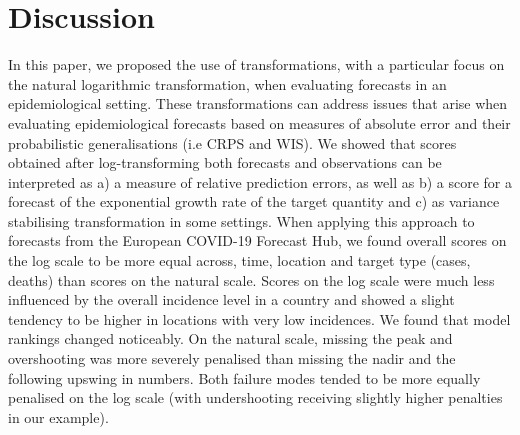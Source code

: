 \documentclass{article}
\begin{document}
\section{Discussion}
\label{sec:discussion}

In this paper, we proposed the use of transformations, with a particular focus on the natural logarithmic transformation, when evaluating forecasts in an epidemiological setting. These transformations can address issues that arise when evaluating epidemiological forecasts based on measures of absolute error and their probabilistic generalisations (i.e CRPS and WIS). We showed that scores obtained after log-transforming both forecasts and observations can be interpreted as a) a measure of relative prediction errors, as well as b) a score for a forecast of the exponential growth rate of the target quantity and c) as variance stabilising transformation in some settings.
When applying this approach to forecasts from the European COVID-19 Forecast Hub, we found overall scores on the log scale to be more equal across, time, location and target type (cases, deaths) than scores on the natural scale. Scores on the log scale were much less influenced by the overall incidence level in a country and showed a slight tendency to be higher in locations with very low incidences. We found that model rankings changed noticeably. 
On the natural scale, missing the peak and overshooting was more severely penalised than missing the nadir and the following upswing in numbers. Both failure modes tended to be more equally penalised on the log scale (with undershooting receiving slightly higher penalties in our example). 
\end{document}
